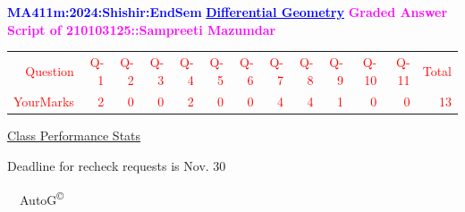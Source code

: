 \documentclass{article}                              %
\begin{document}
%
\vspace*{1in}

\begin{center}
	\textbf{\textcolor{blue}{\LARGE MA411m:2024:Shishir:EndSem}}
	\vskip 1cm
	\textbf{\textcolor{blue}{\underline{\Large Differential Geometry}}}
	\vskip 1cm
	\textbf{\textcolor{magenta}{\LARGE Graded Answer Script of 210103125::Sampreeti Mazumdar}}
\end{center}


\begin{center}
	\Huge 
	\textcolor{red}{
	\begin{tabular}{*{13}{r}}
		Question&Q-1& Q-2& Q-3& Q-4& Q-5& Q-6& Q-7& Q-8& Q-9& Q-10& Q-11&Total  \\
        	YourMarks&2&0&0&2&0&0&4&4&1&0&0&13
	\end{tabular}
	}
        \vskip 2cm
	\large
	\underline{Class Performance Stats}
	\DTLsetseparator{;}
	\begin{table}[htbp]
		\centering
	\end{table}
	\vskip 1cm
	Deadline for recheck requests is Nov. 30
\end{center}
\ \vfill \ \hfill \small AutoG\textsuperscript{\copyright}
\newpage
%
\end{document}
